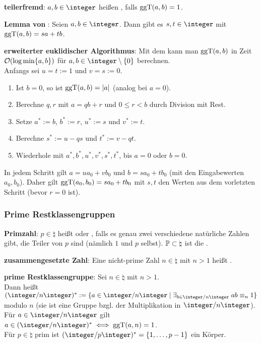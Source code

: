 \textbf{teilerfremd}:
$a, b \in \integer$ heißen , falls $\operatorname{ggT}(a, b) = 1$.

\textbf{Lemma von }:
Seien $a, b \in \integer$.
Dann gibt es $s, t \in \integer$ mit
$\operatorname{ggT}(a, b) = sa + tb$.

\textbf{erweiterter euklidischer Algorithmus}:
Mit dem  kann man $\operatorname{ggT}(a, b)$ in Zeit
$\mathcal{O}(\log \min\{a, b\})$ für $a, b \in \integer \setminus \{0\}$ berechnen.\\
Anfangs sei $u = t := 1$ und $v = s := 0$.
\begin{enumerate}
    \item
    Ist $b = 0$, so ist $\operatorname{ggT}(a, b) = |a|$ (analog bei $a = 0$).
    
    \item
    Berechne $q, r$ mit $a = qb + r$ und $0 \le r < b$ durch Division mit Rest.
    
    \item
    Setze $a^\ast := b$, $b^\ast := r$, $u^\ast := s$ und $v^\ast := t$.
    
    \item
    Berechne $s^\ast := u - qs$ und $t^\ast := v - qt$.
    
    \item
    Wiederhole mit $a^\ast, b^\ast, u^\ast, v^\ast, s^\ast, t^\ast$,
    bis $a = 0$ oder $b = 0$.
\end{enumerate}
In jedem Schritt gilt $a = ua_0 + vb_0$ und $b = sa_0 + tb_0$
(mit den Eingabewerten $a_0, b_0$).
Daher gilt $\operatorname{ggT}(a_0, b_0) = sa_0 + tb_0$ mit $s, t$ den Werten aus dem vorletzten Schritt
(bevor $r = 0$ ist).


\pagebreak

\subsubsection{%
    Prime Restklassengruppen%
}

\textbf{Primzahl}:
$p \in \natural$ heißt  oder , falls es genau zwei verschiedene
natürliche Zahlen gibt, die Teiler von $p$ sind (nämlich $1$ und $p$ selbst).
$\mathbb{P} \subset \natural$ ist die .

\textbf{zusammengesetzte Zahl}:
Eine nicht-prime Zahl $n \in \natural$ mit $n > 1$ heißt .

\textbf{prime Restklassengruppe}:
Sei $n \in \natural$ mit $n > 1$.\\
Dann heißt $(\ZnZ)^\ast := \{a \in \ZnZ \;|\; \exists_{b \in \ZnZ}\; ab \equiv_n 1\}$
 modulo $n$
(sie ist eine Gruppe bzgl. der Multiplikation in $\ZnZ$).\\
Für $a \in \ZnZ$ gilt $a \in (\ZnZ)^{\ast} \iff \ggT(a, n) = 1$.\\
Für $p \in \natural$ prim ist $(\ZpZ)^\ast = \{1, \dotsc, p-1\}$ ein Körper.

